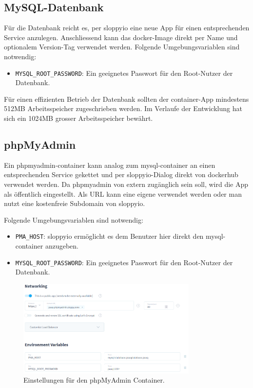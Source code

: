 \documentclass[../main.tex]{subfiles}
\begin{document}
	\subsection{MySQL-Datenbank}
	\par Für die Datenbank reicht es, per \gls{sloppyio} eine neue App für einen entsprechenden Service anzulegen. Anschliessend kann das \gls{docker}-Image direkt per Name und optionalem Version-Tag verwendet werden. Folgende Umgebungsvariablen sind notwendig:
	\begin{itemize}
		\item \texttt{MYSQL\_ROOT\_PASSWORD}: Ein geeignetes Passwort für den Root-Nutzer der Datenbank.
	\end{itemize}
	\par \noindent Für einen effizienten Betrieb der Datenbank sollten der \gls{container}-App mindestens 512MB Arbeitsspeicher zugeschrieben werden. Im Verlaufe der Entwicklung hat sich ein 1024MB grosser Arbeitsspeicher bewährt.
	
	\subsection{phpMyAdmin}
	\par Ein \gls{phpmyadmin}-\gls{container} kann analog zum \gls{mysql}-\gls{container} an einen entsprechenden Service gekettet und per \gls{sloppyio}-Dialog direkt von \gls{dockerhub} verwendet werden. Da \gls{phpmyadmin} von extern zugänglich sein soll, wird die App als öffentlich eingestellt. Als URL kann eine eigene verwendet werden oder man nutzt eine kostenfreie Subdomain von \gls{sloppyio}. 
	\par \noindent Folgende Umgebungsvariablen sind notwendig:
	\begin{itemize}
		\item \texttt{PMA\_HOST}: \gls{sloppyio} ermöglicht es dem Benutzer hier direkt den \gls{mysql}-\gls{container} anzugeben.
		\item \texttt{MYSQL\_ROOT\_PASSWORD}: Ein geeignetes Passwort für den Root-Nutzer der Datenbank.
	\end{itemize}
	
	\begin{figure}[H]
		\centering
		\includegraphics[width=0.8\textwidth]{../images/SloppyPHPPreferences} 
		\caption{Einstellungen für den phpMyAdmin Container.}
		\label{fig:SloppyPHPPreferences}
	\end{figure}
	
\end{document}

